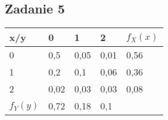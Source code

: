 \subsection{Zadanie 5}

\begin{tabular}{| l | l | l | l | l |}
    \hline
    x/y & 0 & 1 & 2 & $f_X(x)$ \\ \hline
    0 & 0,5 & 0,05 & 0,01 & 0,56 \\ \hline
    1 & 0,2 & 0,1 & 0,06 & 0,36 \\ \hline
    2 & 0,02 & 0,03 & 0,03 & 0,08 \\ \hline
    $f_Y(y)$ & 0,72 & 0,18 & 0,1 & \\ \hline
\end{tabular}
